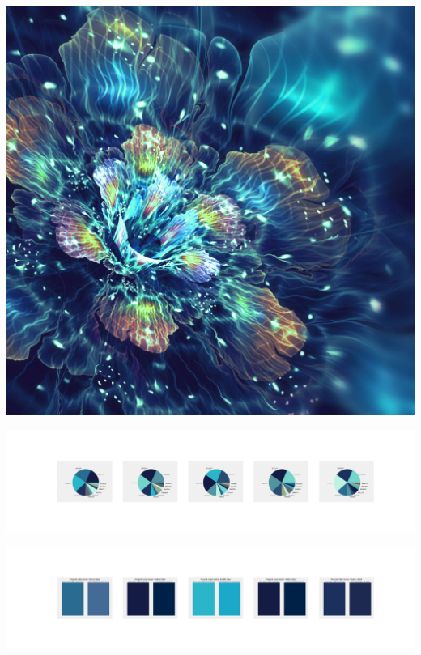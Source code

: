 \documentclass[11pt]{article}
\begin{document}
\begin{landscape}
    \begin{center}
    \includegraphics[width=\textwidth]{./nbimg/file (295).jpg}
    \end{center}

    \begin{center}
    \includegraphics[width=250mm]{./nbimg/pie-217.jpg}
    \end{center}

    \begin{center}
    \includegraphics[width=250mm]{./nbimg/peak-217.jpg}
    \end{center}
    


\end{landscape}
\end{document}
